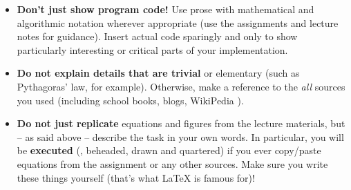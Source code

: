 \begin{itemize}
\item
\textbf{Don't just show program code!}
Use prose with mathematical and algorithmic notation wherever appropriate (use the assignments
and lecture notes for guidance).
Insert actual code sparingly and only to show particularly interesting or critical parts 
of your implementation.
\item
\textbf{Do not explain details that are trivial} or elementary (such as Pythagoras' law, 
for example). Otherwise, make a reference to the \textit{all} sources 
you used (including school books, blogs, WikiPedia \etc).
\item
\textbf{Do not just replicate} equations and figures from the lecture materials, but
-- as said above -- describe the task in your own words. 
In particular, you will be \textbf{executed} (\ie, beheaded, drawn and quartered) if you
ever copy/paste equations from the assignment or
any other sources. Make sure you write these things yourself (that's what LaTeX is 
famous for)!
\end{itemize}